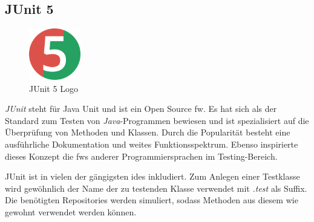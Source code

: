\subsection{JUnit 5}
\begin{figure}
    \begin{center}
        \includegraphics[width=0.2\textwidth]{pics/logos/junit5-logo.png}
        \caption{JUnit 5 Logo}
    \end{center}
\end{figure}
\emph{JUnit} steht für Java Unit und ist ein Open Source \gls{fw}. 
Es hat sich als der Standard zum Testen von \emph{Java}-Programmen bewiesen und ist spezialisiert auf die Überprüfung von Methoden und Klassen.
Durch die Popularität besteht eine ausführliche Dokumentation und weites Funktionsspektrum.
Ebenso inspirierte dieses Konzept die \gls{fw}s anderer Programmiersprachen im Testing-Bereich.

JUnit ist in vielen der gängigsten \gls{ide}s inkludiert. 
Zum Anlegen einer Testklasse wird gewöhnlich der Name der zu testenden Klasse verwendet mit \emph{.test} als Suffix. 
Die benötigten Repositories werden simuliert, sodass Methoden aus diesem wie gewohnt verwendet werden können.
\cite{JUnitAbout}
